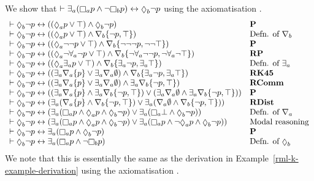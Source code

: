 \begin{example}\label{rml-k45-example-derivation}
We show that $\proves \somerefsA (\necessaryA \atomP \land \lnot \necessaryB \atomP) \iff \possibleB \lnot \atomP$ using the axiomatisation \axiomRmlKFF{}.
$$
\begin{array}{ll}
    \proves \possibleB \lnot \atomP \iff ((\possibleA \atomP \lor \top) \land \possibleB \lnot \atomP) & {\bf P}\\
    \proves \possibleB \lnot \atomP \iff ((\possibleA \atomP \lor \top) \land \coversB \{\lnot \atomP, \top\}) & \text{Defn. of $\coversB$}\\
    \proves \possibleB \lnot \atomP \iff ((\possibleA \lnot \lnot \atomP \lor \top) \land \coversB \{\lnot \lnot \lnot \atomP, \lnot \lnot \top\}) & {\bf P}\\
    \proves \possibleB \lnot \atomP \iff ((\possibleA \lnot \allrefsA \lnot \atomP \lor \top) \land \coversB \{\lnot \allrefsA \lnot \lnot \atomP, \lnot \allrefsA \lnot \top\}) & {\bf RP}\\
    \proves \possibleB \lnot \atomP \iff ((\possibleA \somerefsA \atomP \lor \top) \land \coversB \{\somerefsA \lnot \atomP, \somerefsA \top\}) & \text{Defn. of $\somerefsA$}\\
    \proves \possibleB \lnot \atomP \iff ((\somerefsA \coversA \{\atomP\} \lor \somerefsA \coversA \emptyset) \land \coversB \{\somerefsA \lnot \atomP, \somerefsA \top\}) & {\bf RK45}\\
    \proves \possibleB \lnot \atomP \iff ((\somerefsA \coversA \{\atomP\} \lor \somerefsA \coversA \emptyset) \land \somerefsA \coversB \{\lnot \atomP, \top\}) & {\bf RComm}\\
    \proves \possibleB \lnot \atomP \iff ((\somerefsA \coversA \{\atomP\} \land \somerefsA \coversB \{\lnot \atomP, \top\}) \lor (\somerefsA \coversA \emptyset \land \somerefsA \coversB \{\lnot \atomP, \top\})) & {\bf P}\\
    \proves \possibleB \lnot \atomP \iff (\somerefsA (\coversA \{\atomP\} \land \coversB \{\lnot \atomP, \top\}) \lor \somerefsA (\coversA \emptyset \land \coversB \{\lnot \atomP, \top\})) & {\bf RDist}\\
    \proves \possibleB \lnot \atomP \iff (\somerefsA (\necessaryA \atomP \land \possibleA \atomP \land \possibleB \lnot \atomP) \lor \somerefsA (\necessaryA \bot \land \possibleB \lnot \atomP)) & \text{Defn. of $\coversA$}\\
    \proves \possibleB \lnot \atomP \iff (\somerefsA (\necessaryA \atomP \land \possibleA \atomP \land \possibleB \lnot \atomP) \lor \somerefsA (\necessaryA \atomP \land \lnot \possibleA \atomP \land \possibleB \lnot \atomP)) & \text{Modal reasoning}\\
    \proves \possibleB \lnot \atomP \iff \somerefsA (\necessaryA \atomP \land \possibleB \lnot \atomP) & {\bf P}\\
    \proves \possibleB \lnot \atomP \iff \somerefsA (\necessaryA \atomP \land \lnot \necessaryB \atomP) & \text{Defn. of $\possibleB$}
\end{array}
$$
We note that this is essentially the same as the derivation in Example~\ref{rml-k-example-derivation} using the axiomatisation \axiomRmlK{}.
\end{example}

